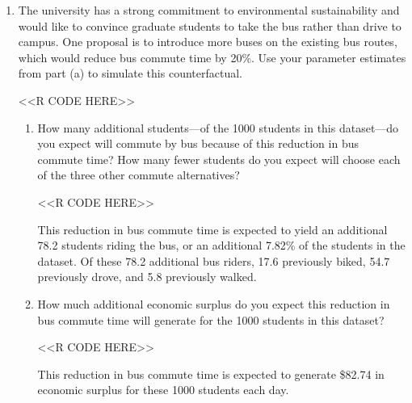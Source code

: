 \documentclass[11pt,letterpaper]{article}
\begin{document}
\begin{enumerate}[label=\alph*., leftmargin=*]
	\item The university has a strong commitment to environmental sustainability and would like to convince graduate students to take the bus rather than drive to campus. One proposal is to introduce more buses on the existing bus routes, which would reduce bus commute time by 20\%. Use your parameter estimates from part (a) to simulate this counterfactual.

	<<R CODE HERE>>

	\begin{enumerate}[label=\roman*.]
		\item How many additional students---of the 1000 students in this dataset---do you expect will commute by bus because of this reduction in bus commute time? How many fewer students do you expect will choose each of the three other commute alternatives?

		<<R CODE HERE>>

		This reduction in bus commute time is expected to yield an additional 78.2 students riding the bus, or an additional 7.82\% of the students in the dataset. Of these 78.2 additional bus riders, 17.6 previously biked, 54.7 previously drove, and 5.8 previously walked.

		\item How much additional economic surplus do you expect this reduction in bus commute time will generate for the 1000 students in this dataset?

		<<R CODE HERE>>

		This reduction in bus commute time is expected to generate \$82.74 in economic surplus for these 1000 students each day.
	\end{enumerate}

\end{enumerate}
\end{document}
